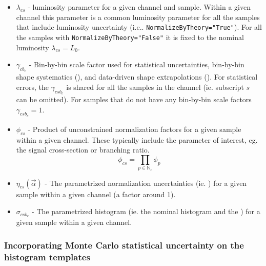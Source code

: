 \begin{itemize}
\item $ \lambda_{cs}$ - luminosity parameter for a given channel and sample.  Within a given channel this parameter is a common luminosity parameter for all the samples that include luminosity uncertainty (i.e.. \texttt{NormalizeByTheory="True"}).  For all the samples with  \texttt{NormalizeByTheory="False"} it is fixed to the nominal luminosity $\lambda_{cs}=L_0$.
\item $\gamma_{cb_e}$ - Bin-by-bin scale factor used for statistical uncertainties, bin-by-bin shape systematics (\SS), and data-driven shape extrapolations (\SF).  For statistical errors, the $\gamma_{csb_e}$ is shared for all the samples in the channel (ie. subscript $s$ can be omitted).  For samples that do not have any bin-by-bin scale factors $\gamma_{csb_e}=1$.
\item $ \phi_{cs}$ - Product of unconstrained normalization factors for a given sample within a given channel.  These typically include the parameter of interest, eg. the signal cross-section or branching ratio.
 \begin{equation}
 \phi_{cs}= \prod_{p\in\mathbb{N}_c} \phi_p 
 \end{equation}
\item $\eta_{cs}(\vec\alpha)$  - The parametrized normalization uncertainties (ie. \OS) for a given sample within a given channel (a factor around 1).
\item $\sigma_{csb_e}$  - The parametrized histogram (ie. the nominal histogram and the \HS) for a given sample within a given channel.
\end{itemize}


\subsubsection{Incorporating Monte Carlo statistical uncertainty on the histogram templates}


